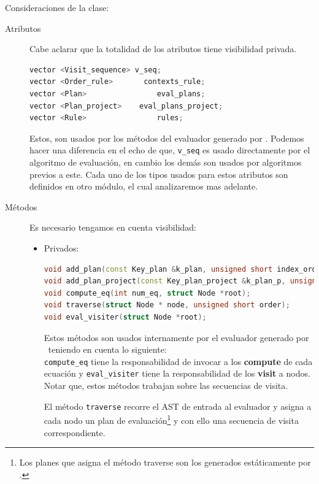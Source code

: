 Consideraciones de la clase:

\begin{description}
\item [Atributos] Cabe aclarar que la totalidad de los atributos tiene visibilidad privada.
 
\begin{lstlisting}[basicstyle=\scriptsize, backgroundcolor=\color{white}, language=c++, columns=fullflexible, linewidth=7cm]
vector <Visit_sequence> v_seq;
vector <Order_rule>       contexts_rule;
vector <Plan>                eval_plans;
vector <Plan_project>    eval_plans_project;
vector <Rule>                rules;
\end{lstlisting}
\vspace{0.3cm}

Estos, son usados por los métodos del evaluador generado por \maggen. Podemos hacer una diferencia en el echo de que, \texttt{v\_seq} es usado directamente por el algoritmo de evaluación, en cambio los demás son usados por algoritmos previos a este. Cada uno de los tipos usados para estos atributos son definidos en otro módulo, el cual analizaremos mas adelante.

\item [Métodos] Es necesario tengamos en cuenta visibilidad:

\begin{itemize}
\item Privados:

\begin{lstlisting}[basicstyle=\scriptsize, backgroundcolor=\color{white}, language=c++, columns=fullflexible, linewidth=13cm]
void add_plan(const Key_plan &k_plan, unsigned short index_order);
void add_plan_project(const Key_plan_project &k_plan_p, unsigned short index_order);
void compute_eq(int num_eq, struct Node *root);
void traverse(struct Node * node, unsigned short order);
void eval_visiter(struct Node *root);
\end{lstlisting}
\vspace{0.3cm}

Estos métodos son usados internamente por el evaluador generado por \maggen\ teniendo en cuenta lo siguiente:\\
\texttt{compute\_eq} tiene la responsabilidad de invocar a los \textbf{compute} de cada ecuación y \texttt{eval\_visiter} tiene la responsabilidad de los \textbf{visit} a nodos. Notar que, estos métodos trabajan sobre las secuencias de visita.

El método \texttt{traverse} recorre el AST de entrada al evaluador y asigna a cada nodo un plan de evaluación\footnote{Los planes que asigna el método traverse son los generados estáticamente por \maggen.} y con ello una secuencia de visita correspondiente.


\end{itemize}
\end{description}
